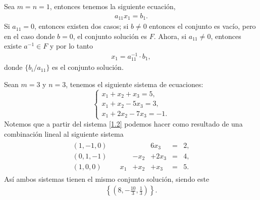 \documentclass[12pt,a4paper]{book}
\begin{document}
    \vspace{1.1cm}
    
    \begin{ejemplo}
    \label{ej:1}
        Sea $m = n = 1$, entonces tenemos la siguiente ecuación,
        \begin{align*}
            a_{11}x_{1} = b_{1}.
        \end{align*}
        Si $a_{11} = 0$, entonces existen dos casos; si $b \neq 0$ entonces el conjunto es vacío, pero en el caso donde $b = 0$, el conjunto solución es $F$. Ahora, si $a_{11} \neq 0$, entonces existe $a^{-1} \in F$ y por lo tanto
        \begin{align*}
            x_{1} = a_{11}^{-1} \cdot b_{1},
        \end{align*}
        donde $\{b_{i} / a_{11}\}$ es el conjunto solución.
    \end{ejemplo}
    
    \begin{ejemplo}
    \label{ej:2}
        Sean $m = 3$ y $n = 3$, tenemos el siguiente sistema de ecuaciones:
        \begin{equation}
            \begin{cases}
                x_{1}+x_{2}+x_{3}=5,\\
                x_{1}+x_{2}-5x_{3}=3,\\
                x_{1}+2x_{2}-7x_{3}=-1.
            \end{cases}
            \tag{1.2}
            \label{1.2}
        \end{equation}
        Notemos que a partir del sistema \eqref{1.2} podemos hacer como resultado de una combinación lineal al siguiente sistema
        \begin{align*}
            \begin{alignedat}{4}
                (1,-1,0)\quad &      &      & 6x_{3}  & ={} & 2,\\
                (0,1,-1)\quad &      & -x_{2} & +2x_{3} & ={} & 4,\\
                (1,0,0)\quad  & x_{1}  & +x_{2} & +x_{3}  & ={} & 5.
            \end{alignedat}
        \end{align*}
        Así ambos sistemas tienen el mismo conjunto solución, siendo este
        \begin{align*}
            \left\{\left(8, - \frac{10}{3}, \frac{1}{3} \right) \right\}.
        \end{align*}
    \end{ejemplo}
\end{document}
